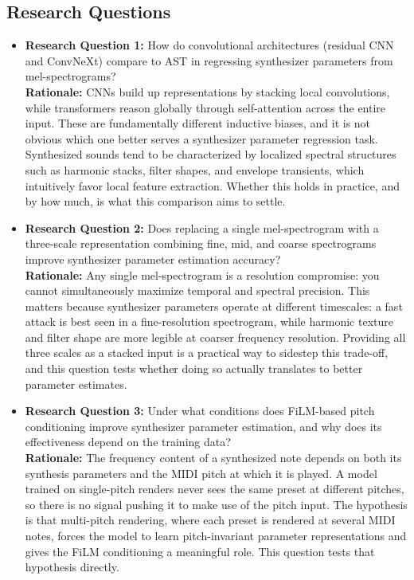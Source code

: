\subsection{Research Questions}

\begin{itemize}

    \item[$\blacksquare$] \textbf{Research Question 1:} How do convolutional architectures (residual CNN and ConvNeXt) compare to AST in regressing synthesizer parameters from mel-spectrograms? \\
    \textbf{Rationale:} CNNs build up representations by stacking local convolutions, while transformers reason globally through self-attention across the entire input. These are fundamentally different inductive biases, and it is not obvious which one better serves a synthesizer parameter regression task. Synthesized sounds tend to be characterized by localized spectral structures such as harmonic stacks, filter shapes, and envelope transients, which intuitively favor local feature extraction. Whether this holds in practice, and by how much, is what this comparison aims to settle.

    \item[$\blacksquare$] \textbf{Research Question 2:} Does replacing a single mel-spectrogram with a three-scale representation combining fine, mid, and coarse spectrograms improve synthesizer parameter estimation accuracy? \\
    \textbf{Rationale:} Any single mel-spectrogram is a resolution compromise: you cannot simultaneously maximize temporal and spectral precision. This matters because synthesizer parameters operate at different timescales: a fast attack is best seen in a fine-resolution spectrogram, while harmonic texture and filter shape are more legible at coarser frequency resolution. Providing all three scales as a stacked input is a practical way to sidestep this trade-off, and this question tests whether doing so actually translates to better parameter estimates.

    \item[$\blacksquare$] \textbf{Research Question 3:} Under what conditions does FiLM-based pitch conditioning improve synthesizer parameter estimation, and why does its effectiveness depend on the training data? \\
    \textbf{Rationale:} The frequency content of a synthesized note depends on both its synthesis parameters and the MIDI pitch at which it is played. A model trained on single-pitch renders never sees the same preset at different pitches, so there is no signal pushing it to make use of the pitch input. The hypothesis is that multi-pitch rendering, where each preset is rendered at several MIDI notes, forces the model to learn pitch-invariant parameter representations and gives the FiLM conditioning a meaningful role. This question tests that hypothesis directly.

\end{itemize}

